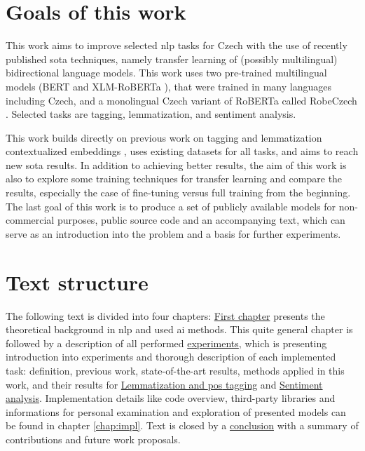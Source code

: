 \section*{Goals of this work}
This work aims to improve selected \acrfull{nlp} tasks for Czech with the use of recently published \acrfull{sota} techniques, namely transfer learning of (possibly multilingual) bidirectional language models. This work uses two pre-trained multilingual models (BERT \citep{Devlin2019} and XLM-RoBERTa \citep{Conneau2019}), that were trained in many languages including Czech, and a monolingual Czech variant of RoBERTa called RobeCzech \citep{Straka2021}. Selected tasks are tagging, lemmatization, and sentiment analysis.\par This work builds directly on previous work on tagging and lemmatization contextualized embeddings \citep{Straka2019}, uses existing datasets for all tasks, and aims to reach new \acrfull{sota} results. In addition to achieving better results, the aim of this work is also to explore some training techniques for transfer learning and compare the results, especially the case of fine-tuning versus full training from the beginning.  The last goal of this work is to produce a set of publicly available models for non-commercial purposes, public source code and an accompanying text, which can serve as an introduction into the problem and a basis for further experiments.
\section*{Text structure}
The following text is divided into four chapters: \hyperref[chap:theandme]{First chapter} presents the theoretical background in \acrshort{nlp} and used \acrfull{ai} methods. This quite general chapter is followed by a description of all performed \hyperref[chap:exp]{experiments}, which is presenting introduction into experiments and thorough description of each implemented task: definition, previous work, state-of-the-art results, methods applied in this work, and their results for \hyperref[chap:tag]{Lemmatization and \acrlong{pos} tagging} and  \hyperref[chap:sent]{Sentiment analysis}. Implementation details like code overview, third-party libraries and informations for personal examination and exploration of presented models can be found in chapter \ref{chap:impl}. Text is closed by a \hyperref[chap:concl]{conclusion} with a summary of contributions and future work proposals.


